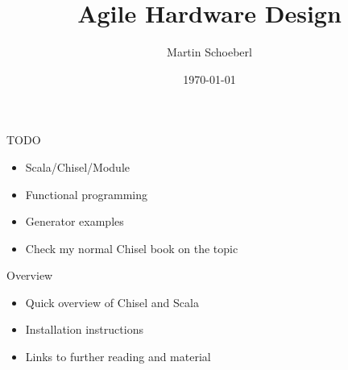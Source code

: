 

\newif\ifbook


\title{Agile Hardware Design}
\author{Martin Schoeberl}
\date{\today}



\begin{frame}
\titlepage
\end{frame}


\begin{frame}[fragile]{TODO}
\begin{itemize}
\item Scala/Chisel/Module
\item Functional programming
\item Generator examples
\item Check my normal Chisel book on the topic
\end{itemize}
\end{frame}

\begin{frame}[fragile]{Overview}
\begin{itemize}
\item Quick overview of Chisel and Scala
\item Installation instructions
\item Links to further reading and material
\end{itemize}
\end{frame}



